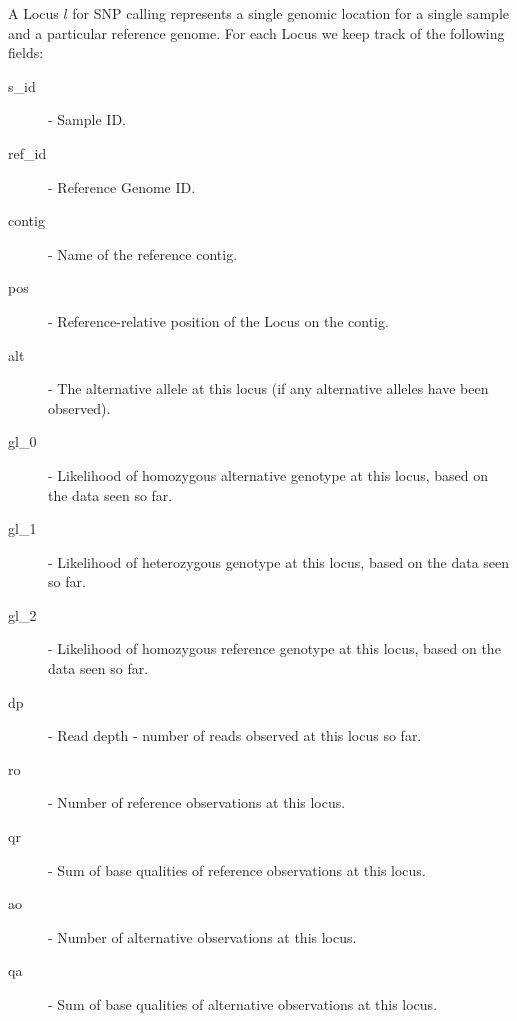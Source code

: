 A Locus $l$ for SNP calling represents a single genomic location for a single sample and a particular reference genome. For each Locus we keep track of the following fields:

\begin{description}
    \item[s\_id] - Sample ID.
    \item[ref\_id] - Reference Genome ID.
    \item[contig] - Name of the reference contig.
    \item[pos] - Reference-relative position of the Locus on the contig.
    \item[alt] - The alternative allele at this locus (if any alternative alleles have been observed).
    \item[gl\_0] - Likelihood of homozygous alternative genotype at this locus, based on the data seen so far.
    \item[gl\_1] - Likelihood of heterozygous genotype at this locus, based on the data seen so far.
    \item[gl\_2] - Likelihood of homozygous reference genotype at this locus, based on the data seen so far.
    \item[dp] - Read depth - number of reads observed at this locus so far.
    \item[ro] - Number of reference observations at this locus.
    \item[qr] - Sum of base qualities of reference observations at this locus.
    \item[ao] - Number of alternative observations at this locus.
    \item[qa] - Sum of base qualities of alternative observations at this locus.       
\end{description}

